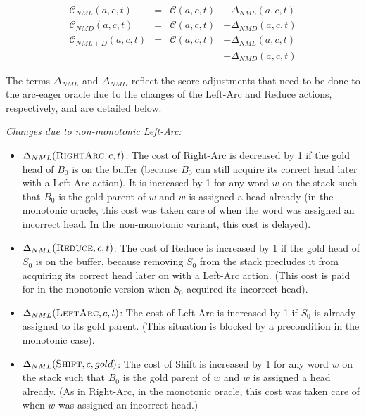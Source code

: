 \documentclass[11pt,letterpaper]{article}
\begin{document}
\[\begin{array}{lcll} 
\mathcal{C}_{NML}(a,c,t)& = &\mathcal{C}(a,c,t)&+ \Delta_{NML}(a,c,t)\\
\mathcal{C}_{NMD}(a,c,t)& = &\mathcal{C}(a,c,t)&+ \Delta_{NMD}(a,c,t)\\
\mathcal{C}_{NML+D}(a,c,t)& = &\mathcal{C}(a,c,t)&+ \Delta_{NML}(a,c,t)\\ 
                                     &  & &+ \Delta_{NMD}(a,c,t)
\end{array}\]

The terms $\Delta_{NML}$ and $\Delta_{NMD}$ reflect the score adjustments that
need to be done to the arc-eager oracle due to the changes of the Left-Arc and
Reduce actions, respectively, and are detailed below.

\noindent \emph{Changes due to non-monotonic Left-Arc:}

\begin{itemize}
   \item $\Delta_{NML}(\textsc{RightArc},c,t)$: The cost of Right-Arc is
      decreased by 1 if the gold head of $B_0$ is on the buffer
         (because $B_0$ can still acquire its correct head later with a Left-Arc action).
It is increased by 1 for any word $w$ on the stack such that $B_0$ is the gold
parent of $w$ and $w$ is assigned a head already (in the monotonic oracle,
this cost was taken care of when the word was assigned an incorrect head. In the
non-monotonic variant, this cost is delayed).

   \item $\Delta_{NML}(\textsc{Reduce},c,t)$: The cost of Reduce is increased
      by 1 if the gold head of $S_0$ is on the buffer,
because removing $S_0$ from the stack precludes it from acquiring its correct head later on with
a Left-Arc action. (This cost is paid for in the monotonic version when $S_0$
acquired its incorrect head).

   \item $\Delta_{NML}(\textsc{LeftArc},c,t)$: The cost of Left-Arc is increased by 1 if $S_0$ is already assigned to its gold
parent. (This situation is blocked by a precondition in the monotonic
case).

  \item $\Delta_{NML}(\textsc{Shift},c,gold)$: The cost of Shift is increased
     by 1 for any word $w$ on the stack such that $B_0$ is the gold
parent of $w$ and $w$ is assigned a head already. (As in Right-Arc, in the monotonic oracle,
this cost was taken care of when $w$ was assigned an incorrect head.)
\end{itemize}
\end{document}
